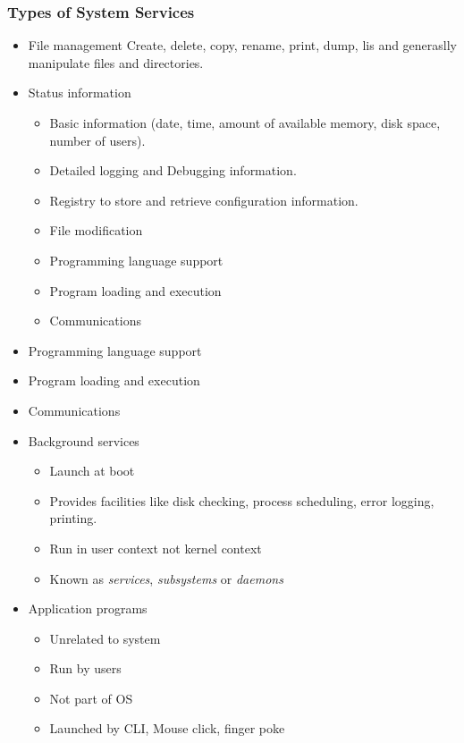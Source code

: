 \documentclass[]{article}
\begin{document}
\subsubsection*{Types of System Services}
\begin{itemize}
    \item File management
        \subitem Create, delete, copy, rename, print, dump, lis and generaslly manipulate files and directories.
    \item Status information
    \begin{itemize}
        \item Basic information (date, time, amount of available memory, disk space, number of users).
        \item Detailed logging and Debugging information.
        \item Registry to store and retrieve configuration information.
        \item File modification
        \item Programming language support
        \item Program loading and execution
        \item Communications
    \end{itemize}
    \item Programming language support
    \item Program loading and execution
    \item Communications
    \item Background services
    \begin{itemize}
        \item Launch at boot
        \item Provides facilities like disk checking, process scheduling, error logging, printing.
        \item Run in user context not kernel context
        \item Known as \emph{services}, \emph{subsystems} or \emph{daemons}
    \end{itemize}
    \item Application programs
    \begin{itemize}
        \item Unrelated to system
        \item Run by users
        \item Not part of OS
        \item Launched by CLI, Mouse click, finger poke
    \end{itemize}
\end{itemize}
\end{document}
